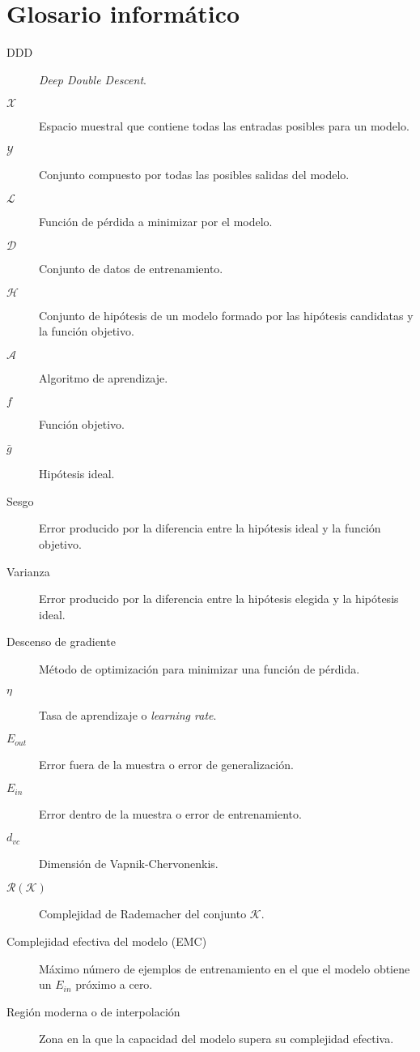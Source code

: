 
\chapter*{Glosario informático}

\begin{description} 
  \item[DDD] \textit{Deep Double Descent}.
  \item[$\mathcal{X}$] Espacio muestral que contiene todas las entradas posibles para un modelo.
  \item[$\mathcal{Y}$] Conjunto compuesto por todas las posibles salidas del modelo.
  \item[$\mathcal{L}$] Función de pérdida a minimizar por el modelo.
  \item[$\mathcal{D}$] Conjunto de datos de entrenamiento.
  \item[$\mathcal{H}$] Conjunto de hipótesis de un modelo formado por las hipótesis candidatas y la función objetivo.
  \item[$\mathcal{A}$] Algoritmo de aprendizaje. 
  \item[$f$] Función objetivo. 
  \item[$\bar{g}$] Hipótesis ideal.
  \item[Sesgo] Error producido por la diferencia entre la hipótesis ideal y la función objetivo.
  \item[Varianza] Error producido por la diferencia entre la hipótesis elegida y la hipótesis ideal.
  \item[Descenso de gradiente] Método de optimización para minimizar una función de pérdida.
  \item[$\eta$] Tasa de aprendizaje o \textit{learning rate}.
  \item[$E_{out}$] Error fuera de la muestra o error de generalización. 
  \item[$E_{in}$] Error dentro de la muestra o error de entrenamiento.
  \item[$d_{vc}$] Dimensión de Vapnik-Chervonenkis.
  \item[$\mathcal{R}(\mathcal{K})$] Complejidad de Rademacher del conjunto $\mathcal{K}$.
  \item[Complejidad efectiva del modelo (EMC)] Máximo número de ejemplos de entrenamiento en el que el modelo obtiene un $E_{in}$ próximo a cero.
  \item[Región moderna o de interpolación] Zona en la que la capacidad del modelo supera su complejidad efectiva.

\end{description}

